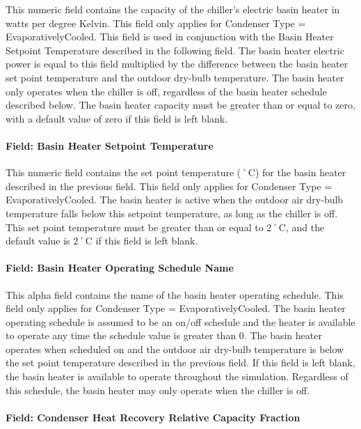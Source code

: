This numeric field contains the capacity of the chiller's electric basin heater in watts per degree Kelvin. This field only applies for Condenser Type = EvaporativelyCooled. This field is used in conjunction with the Basin Heater Setpoint Temperature described in the following field. The basin heater electric power is equal to this field multiplied by the difference between the basin heater set point temperature and the outdoor dry-bulb temperature. The basin heater only operates when the chiller is off, regardless of the basin heater schedule described below. The basin heater capacity must be greater than or equal to zero, with a default value of zero if this field is left blank.

\paragraph{Field: Basin Heater Setpoint Temperature}\label{field-basin-heater-setpoint-temperature-4-000}

This numeric field contains the set point temperature (˚C) for the basin heater described in the previous field. This field only applies for Condenser Type = EvaporativelyCooled. The basin heater is active when the outdoor air dry-bulb temperature falls below this setpoint temperature, as long as the chiller is off. This set point temperature must be greater than or equal to 2˚C, and the default value is 2˚C if this field is left blank.

\paragraph{Field: Basin Heater Operating Schedule Name}\label{field-basin-heater-operating-schedule-name-4-000}

This alpha field contains the name of the basin heater operating schedule. This field only applies for Condenser Type = EvaporativelyCooled. The basin heater operating schedule is assumed to be an on/off schedule and the heater is available to operate any time the schedule value is greater than 0. The basin heater operates when scheduled on and the outdoor air dry-bulb temperature is below the set point temperature described in the previous field. If this field is left blank, the basin heater is available to operate throughout the simulation. Regardless of this schedule, the basin heater may only operate when the chiller is off.

\paragraph{Field: Condenser Heat Recovery Relative Capacity Fraction}\label{field-heat-recovery-fraction}

